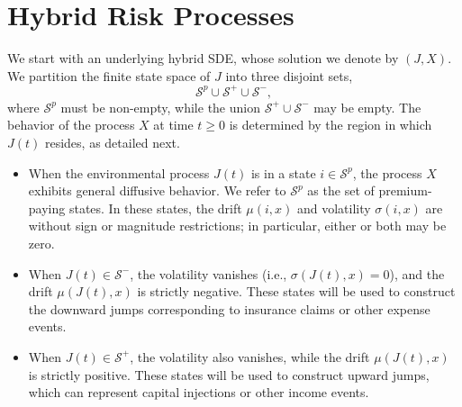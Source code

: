 \documentclass[11pt]{article}
\numberwithin{table}{section}
\numberwithin{figure}{section}
\numberwithin{equation}{section}
\newcommand{\1}{{\mathbf 1}}
\newcommand{\0}{\mat{0}}
\begin{document}
\section{Hybrid Risk Processes}\label{sec:hybrid}

We start with an underlying hybrid SDE, whose solution we denote by \((J,X)\). We partition the finite state space of $J$ into three disjoint sets,
\[
\mathcal{S}^p \cup \mathcal{S}^+ \cup \mathcal{S}^-,
\]
where \(\mathcal{S}^p\) must be non-empty, while the union \(\mathcal{S}^+ \cup \mathcal{S}^-\) may be empty.
The behavior of the process \(X\) at time $t\ge 0$ is determined by the region in which \(J(t)\) resides, as detailed next.
\begin{itemize}
    \item When the environmental process \(J(t)\) is in a state \(i \in \mathcal{S}^p\), the process \(X\) exhibits general diffusive behavior. We refer to \(\mathcal{S}^p\) as the set of premium-paying states. In these states, the drift \(\mu(i,x)\) and volatility \(\sigma(i,x)\) are without sign or magnitude restrictions; in particular, either or both may be zero.
    \item When \(J(t) \in \mathcal{S}^-\), the volatility vanishes (i.e., \(\sigma(J(t),x)=0\)), and the drift \(\mu(J(t),x)\) is strictly negative. These states will be used to construct the downward jumps corresponding to insurance claims {or other expense events}.
    \item When \(J(t) \in \mathcal{S}^+\), the volatility also vanishes, while the drift \(\mu(J(t),x)\) is strictly positive. These states will be used to construct upward jumps, which can represent capital injections or other income events.
\end{itemize}
\end{document}
